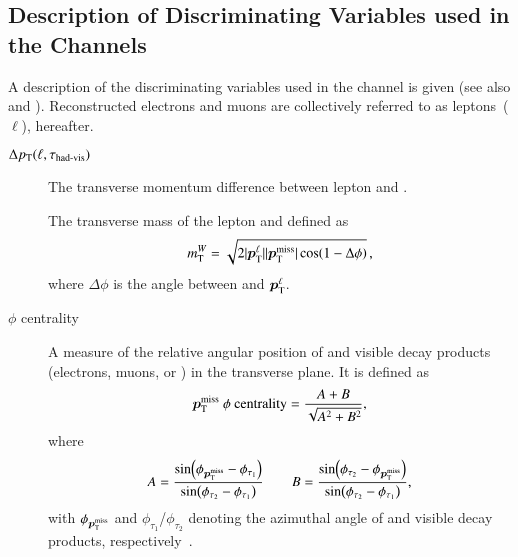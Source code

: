 \subsection{Description of Discriminating Variables used in the \lephad
  Channels}%
\label{app:lephad_mva_variables}

A description of the discriminating variables used in the \lephad channel is
given (see also  and
). Reconstructed electrons and muons are collectively
referred to as leptons~($\ell$), hereafter.
\begin{description}

\item[$\Delta p_{\text{T}}(\ell, \tau_{\text{had-vis}})$] The transverse momentum difference between
  lepton and \tauhadvis.

\item[\mTW] The transverse mass of the lepton and \pTmiss defined as
  \begin{align*}
    m_{\text{T}}^W = \sqrt{2 |\bm{p}_{\text{T}}^{\ell}| |\bm{p}_{\text{T}}^{\text{miss}}| \cos(1 -
    \Delta\phi)} \,\text{,}
  \end{align*}
  where $\Delta\phi$ is the angle between \pTmiss and
  $\bm{p}_{\text{T}}^{\ell}$.

\item[\pTmiss $\phi$ centrality] A measure of the relative angular position of
  \pTmiss and visible \taulepton decay products (electrons, muons, or
  \tauhadvis) in the transverse plane. It is defined as
  \begin{align*}
    \bm{p}_{\text{T}}^{\text{miss}}\text{ }\phi\text{ centrality} = \frac{A + B}{\sqrt{A^2 + B^2}} \text{,}
  \end{align*}
  where
  \begin{align*}
    A = \frac{\sin(\phi_{\bm{p}_{\text{T}}^{\text{miss}}} - \phi_{\tau_1})}{\sin(\phi_{\tau_2} - \phi_{\tau_1})} \qquad B = \frac{\sin(\phi_{\tau_2} - \phi_{\bm{p}_{\text{T}}^{\text{miss}}})}{\sin(\phi_{\tau_2} - \phi_{\tau_1})} \text{,}
  \end{align*}
  with $\phi_{\bm{p}_{\text{T}}^{\text{miss}}}$ and $\phi_{\tau_1}$/$\phi_{\tau_2}$ denoting the
  azimuthal angle of \pTmiss and visible \taulepton decay products,
  respectively~\cite{HIGG-2013-32, HIGG-2016-16-witherratum}.


\end{description}
